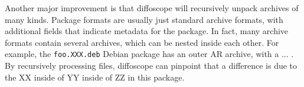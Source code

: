 \begin{itemize}
Another major improvement is that diffoscope will recursively unpack 
archives of many kinds.  Package formats are usually just standard archive
formats, with additional fields that indicate metadata for the package.  In
fact, many archive formats contain several archives, which can be nested
inside each other.  For example, the {\tt foo.XXX.deb} Debian package has 
an outer AR archive, with a ... .  By
recursively processing files, diffoscope can pinpoint that a difference is
due to the XX inside of YY inside of ZZ in this package.

\end{itemize}
